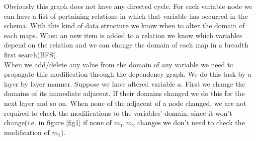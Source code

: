 \documentclass[12pt]{article}
\begin{document}
Obviously this graph does not have any directed cycle. For each variable node we can have a list of pertaining relations in which that variable has occurred in the schema. With this kind of data structure we know when to alter the domain of each maps. When an new item is added to a relation we know which variables depend on the relation and we can change the domain of each map in a breadth first search(BFS).  \\

When we add/delete any value from the domain of any variable we need to propagate this modification through the dependency graph. We do this task by a layer by layer manner. Suppose we have altered variable $a$. First we change the domains of its immediate adjacent. If their domains changed we do this for the next layer and so on. When none of the adjacent of a node changed, we are not required to check the modifications to the variables' domain, since it won't change(i.e. in figure \ref{fig1} if none of $m_{1},m_{2}$ changes we don't need to check the modification of $m_{3}$).
\end{document}
